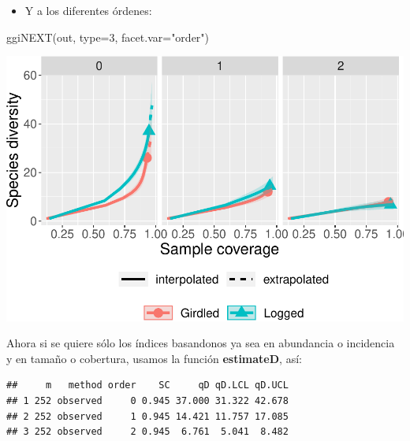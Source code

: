 \documentclass[
]{article}
\newenvironment{Shaded}{\begin{snugshade}}{\end{snugshade}}
\newcommand{\AttributeTok}[1]{\textcolor[rgb]{0.77,0.63,0.00}{#1}}
\newcommand{\DecValTok}[1]{\textcolor[rgb]{0.00,0.00,0.81}{#1}}
\newcommand{\FloatTok}[1]{\textcolor[rgb]{0.00,0.00,0.81}{#1}}
\newcommand{\FunctionTok}[1]{\textcolor[rgb]{0.00,0.00,0.00}{#1}}
\newcommand{\NormalTok}[1]{#1}
\newcommand{\SpecialCharTok}[1]{\textcolor[rgb]{0.00,0.00,0.00}{#1}}
\newcommand{\StringTok}[1]{\textcolor[rgb]{0.31,0.60,0.02}{#1}}
\providecommand{\tightlist}{%
  \setlength{\itemsep}{0pt}\setlength{\parskip}{0pt}}
\begin{document}
\newpage

\begin{itemize}
\tightlist
\item
  Y a los diferentes órdenes:
\end{itemize}

\begin{Shaded}
\begin{Highlighting}[]
\FunctionTok{ggiNEXT}\NormalTok{(out, }\AttributeTok{type=}\DecValTok{3}\NormalTok{, }\AttributeTok{facet.var=}\StringTok{"order"}\NormalTok{)}
\end{Highlighting}
\end{Shaded}

\includegraphics{Clase1-bioest_files/figure-latex/unnamed-chunk-38-1.pdf}

\newpage

Ahora si se quiere sólo los índices basandonos ya sea en abundancia o
incidencia y en tamaño o cobertura, usamos la función
\textbf{estimateD}, así:

\begin{Shaded}
\end{Shaded}

\begin{verbatim}
##     m   method order    SC     qD qD.LCL qD.UCL
## 1 252 observed     0 0.945 37.000 31.322 42.678
## 2 252 observed     1 0.945 14.421 11.757 17.085
## 3 252 observed     2 0.945  6.761  5.041  8.482
\end{verbatim}
\end{document}
